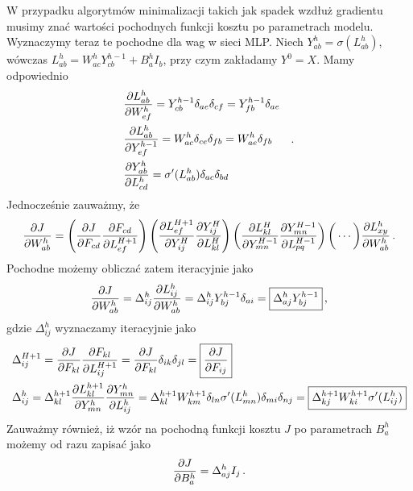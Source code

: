 \documentclass{myclass}
\begin{document}
W przypadku algorytmów minimalizacji takich jak spadek wzdłuż gradientu musimy znać wartości
pochodnych funkcji kosztu po parametrach modelu. Wyznaczymy teraz te pochodne dla wag w sieci MLP.
Niech \(Y_{ab}^h = \sigma(L_{ab}^h)\), wówczas \(L_{ab}^h = W_{ac}^hY_{cb}^{h-1} + B_a^hI_b\), przy
czym zakładamy \(Y^0 = X\). Mamy odpowiednio
\begin{equation*}
    \begin{split}
        &\pdv{L_{ab}^h}{W_{ef}^h} = Y_{cb}^{h-1}\delta_{ae}\delta_{cf} = Y_{fb}^{h-1}\delta_{ae}\\
        &\pdv{L_{ab}^h}{Y_{ef}^{h-1}} = W_{ac}^h\delta_{ce}\delta_{fb} = W_{ae}^h\delta_{fb}\\
        &\pdv{Y_{ab}^h}{L_{cd}^{h}} = \sigma'(L_{ab}^h)\delta_{ac}\delta_{bd}
    \end{split}\quad.
\end{equation*}
Jednocześnie zauważmy, że
\begin{equation*}
    \pdv{J}{W_{ab}^h} = \left(\pdv{J}{F_{cd}}\pdv{F_{cd}}{L_{ef}^{H+1}}\right)\left(\pdv{L_{ef}^{H+1}}{Y_{ij}^H}\pdv{Y_{ij}^H}{L_{kl}^H}\right)\left(\pdv{L_{kl}^H}{Y_{mn}^{H-1}}\pdv{Y_{mn}^{H-1}}{L_{pq}^{H-1}}\right)\bigg(\cdots\bigg)\pdv{L_{xy}^h}{W_{ab}^h}\,.
\end{equation*}
Pochodne możemy obliczać zatem iteracyjnie jako
\begin{equation*}
    \pdv{J}{W_{ab}^h} = \Delta^h_{ij}\pdv{L_{ij}^h}{W_{ab}^h} = \Delta^h_{ij}Y_{bj}^{h-1}\delta_{ai} = \boxed{\Delta_{aj}^hY_{bj}^{h-1}}\,,
\end{equation*}
gdzie \(\Delta_{ij}^h\) wyznaczamy iteracyjnie jako
\begin{equation*}
    \begin{split}
        &\Delta^{H+1}_{ij} = \pdv{J}{F_{kl}}\pdv{F_{kl}}{L_{ij}^{H+1}} = \pdv{J}{F_{kl}}\delta_{ik}\delta_{jl} = \boxed{\pdv{J}{F_{ij}}}\\
        &\Delta^{h}_{ij} = \Delta_{kl}^{h+1}\pdv{L^{h+1}_{kl}}{Y_{mn}^h}\pdv{Y_{mn}^h}{L_{ij}^h} = \Delta_{kl}^{h+1} W^{h+1}_{km}\delta_{ln}\sigma'(L_{mn}^h)\delta_{mi}\delta_{nj} = \boxed{\Delta_{kj}^{h+1}W_{ki}^{h+1}\sigma'(L_{ij}^h)}
    \end{split}
\end{equation*}
Zauważmy również, iż wzór na pochodną funkcji kosztu \(J\) po parametrach \(B^h_a\) możemy od razu
zapisać jako
\begin{equation*}
    \pdv{J}{B_{a}^h} = \Delta_{aj}^hI_j\,.
\end{equation*}
\end{document}

